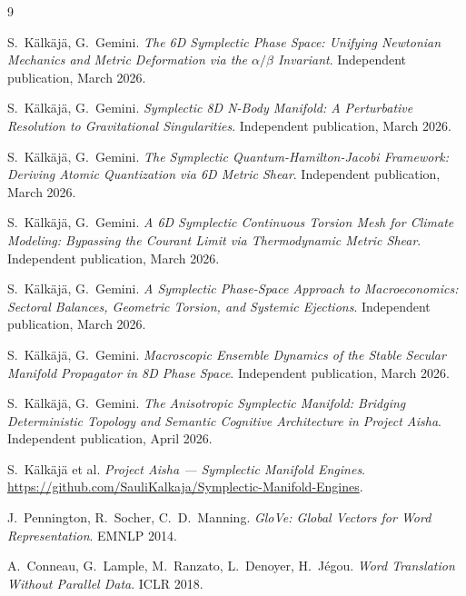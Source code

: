 \documentclass[11pt,a4paper]{article}
\begin{document}
\begin{thebibliography}{9}

S.~K\"{a}lk\"{a}j\"{a}, G.~Gemini.
\newblock \emph{The 6D Symplectic Phase Space: Unifying Newtonian Mechanics and Metric Deformation via the $\alpha/\beta$ Invariant}.
\newblock Independent publication, March 2026.

S.~K\"{a}lk\"{a}j\"{a}, G.~Gemini.
\newblock \emph{Symplectic 8D N-Body Manifold: A Perturbative Resolution to Gravitational Singularities}.
\newblock Independent publication, March 2026.

S.~K\"{a}lk\"{a}j\"{a}, G.~Gemini.
\newblock \emph{The Symplectic Quantum-Hamilton-Jacobi Framework: Deriving Atomic Quantization via 6D Metric Shear}.
\newblock Independent publication, March 2026.

S.~K\"{a}lk\"{a}j\"{a}, G.~Gemini.
\newblock \emph{A 6D Symplectic Continuous Torsion Mesh for Climate Modeling: Bypassing the Courant Limit via Thermodynamic Metric Shear}.
\newblock Independent publication, March 2026.

S.~K\"{a}lk\"{a}j\"{a}, G.~Gemini.
\newblock \emph{A Symplectic Phase-Space Approach to Macroeconomics: Sectoral Balances, Geometric Torsion, and Systemic Ejections}.
\newblock Independent publication, March 2026.

S.~K\"{a}lk\"{a}j\"{a}, G.~Gemini.
\newblock \emph{Macroscopic Ensemble Dynamics of the Stable Secular Manifold Propagator in 8D Phase Space}.
\newblock Independent publication, March 2026.

S.~K\"{a}lk\"{a}j\"{a}, G.~Gemini.
\newblock \emph{The Anisotropic Symplectic Manifold: Bridging Deterministic Topology and Semantic Cognitive Architecture in Project Aisha}.
\newblock Independent publication, April 2026.

S.~K\"{a}lk\"{a}j\"{a} et al.
\newblock \emph{Project Aisha — Symplectic Manifold Engines}.
\newblock \url{https://github.com/SauliKalkaja/Symplectic-Manifold-Engines}.

J.~Pennington, R.~Socher, C.~D.~Manning.
\newblock \emph{GloVe: Global Vectors for Word Representation}.
\newblock EMNLP 2014.

A.~Conneau, G.~Lample, M.~Ranzato, L.~Denoyer, H.~J\'{e}gou.
\newblock \emph{Word Translation Without Parallel Data}.
\newblock ICLR 2018.

\end{thebibliography}
\end{document}
